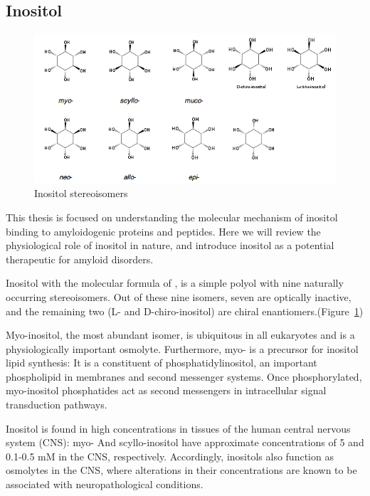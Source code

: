 \subsection{Inositol}
\begin{figure}
\centering
\includegraphics[width=6in]{figures/introduction/inositol.png}
\caption[Inositol]{Inositol stereoisomers}
\label{fig:inositols}
\end{figure}

This thesis is focused on understanding the molecular mechanism of inositol binding to amyloidogenic proteins and peptides. Here we will review the physiological role of inositol in nature, and introduce inositol as a potential therapeutic for amyloid disorders.

Inositol with the molecular formula of , is a simple polyol with nine naturally occurring stereoisomers. Out of these nine isomers, seven are optically inactive, and the remaining two (L- and D-chiro-inositol) are chiral enantiomers.(Figure~\ref{fig:inositols})


Myo-inositol, the most abundant isomer, is ubiquitous in all eukaryotes and is a physiologically important osmolyte.  Furthermore, myo- is a precursor for inositol lipid synthesis: It is a constituent of phosphatidylinositol, an important phospholipid in membranes and second messenger systems. Once phosphorylated, myo-inositol phosphatides act as second messengers in intracellular signal transduction pathways.\cite{Fisher:2002tk}

Inositol is found in high concentrations in tissues of the human central nervous system (CNS): myo- And scyllo-inositol have approximate concentrations of 5 and 0.1-0.5 mM in the CNS, respectively.\cite{Fisher:2002tk} Accordingly, inositols also function as osmolytes in the CNS, where alterations in their concentrations are known to be associated with neuropathological conditions.\cite{Michaelis:1993gf, Fisher:2002tk}


